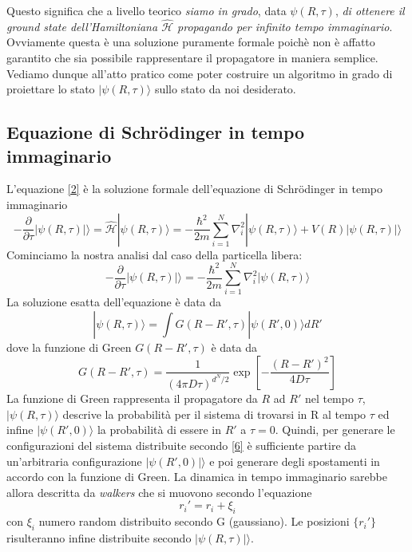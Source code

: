 \documentclass[11pt,a4paper]{article}
\begin{document}
Questo significa che a livello teorico \emph{siamo in grado}, data $\psi(R,\tau)$, \emph{di ottenere il ground state dell'Hamiltoniana $\mathcal{\hat{H}}$ propagando per infinito tempo immaginario}. Ovviamente questa è una soluzione puramente formale poichè non è affatto garantito che sia possibile rappresentare il propagatore in maniera semplice. Vediamo dunque all'atto pratico come poter costruire un algoritmo in grado di proiettare lo stato $|\psi(R,\tau)\rangle$ sullo stato da noi desiderato. 

\subsection{Equazione di Schr\"{o}dinger in tempo immaginario}
L'equazione \eqref{2} è la soluzione formale dell'equazione di Schr\"{o}dinger in tempo immaginario
\begin{equation}
-\frac{\partial}{\partial \tau}|\psi(R,\tau)|\rangle = \mathcal{\hat{H}}|\psi(R,\tau)\rangle = -\frac{\hbar^2}{2m} \sum_{i=1}^N \nabla^2_i |\psi(R,\tau)\rangle + V(R)|\psi(R,\tau)|\rangle
\end{equation}
Cominciamo la nostra analisi dal caso della particella libera:
\[
-\frac{\partial}{\partial \tau}|\psi(R,\tau)|\rangle  = -\frac{\hbar^2}{2m} \sum_{i=1}^N \nabla^2_i |\psi(R,\tau)\rangle 
\]
La soluzione esatta dell'equazione è data da
\begin{equation}\label{6}
|\psi(R,\tau)\rangle = \int G(R-R',\tau) |\psi(R',0)\rangle dR'
\end{equation}
dove la funzione di Green $G(R-R',\tau)$ è data da
\begin{equation}
G(R-R',\tau) = \frac{1}{(4\pi D\tau)^{d^N/2}}\exp{\left[ -\frac{(R-R')^2}{4D\tau} \right]}
\end{equation}
La funzione di Green rappresenta il propagatore da $R$ ad $R'$ nel tempo $\tau$, $|\psi(R,\tau)\rangle$ descrive la probabilità per il sistema di trovarsi in R al tempo $\tau$ ed infine $|\psi(R',0)\rangle$ la probabilità di essere in $R'$ a $\tau=0$. Quindi, per generare le configurazioni del sistema distribuite secondo \eqref{6} è sufficiente partire da un'arbitraria configurazione $|\psi(R',0)|\rangle$ e poi generare degli spostamenti in accordo con la funzione di Green. La dinamica in tempo immaginario sarebbe allora descritta da \emph{walkers} che si muovono secondo l'equazione
\[
r_i' = r_i + \xi_i
\]
con $\xi_i$ numero random distribuito secondo G (gaussiano). Le posizioni $\{r_i'\}$ risulteranno infine distribuite secondo $|\psi(R,\tau)|\rangle$. \\
\end{document}
